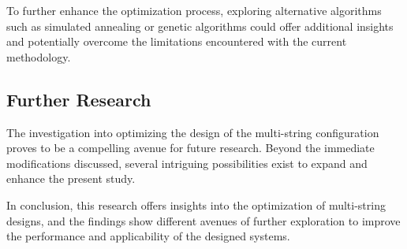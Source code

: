 \documentclass[12pt]{article}
\begin{document}
To further enhance the optimization process, exploring alternative algorithms such as simulated annealing or genetic algorithms could offer additional insights and potentially overcome the limitations encountered with the current methodology.

\subsection{Further Research}

The investigation into optimizing the design of the multi-string configuration proves to be a compelling avenue for future research. Beyond the immediate modifications discussed, several intriguing possibilities exist to expand and enhance the present study.

In conclusion, this research offers insights into the optimization of multi-string designs, and the findings show different avenues of further exploration to improve the performance and applicability of the designed systems.



% 






\end{document}
